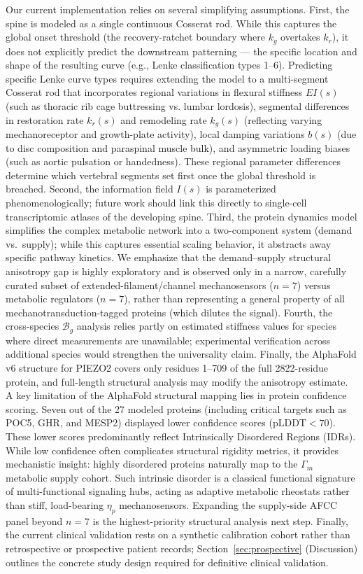 Our current implementation relies on several simplifying assumptions. First, the spine is modeled as a single continuous Cosserat rod. While this captures the global onset threshold (the recovery-ratchet boundary where $k_g$ overtakes $k_r$), it does not explicitly predict the downstream patterning --- the specific location and shape of the resulting curve (e.g., Lenke classification types 1--6). Predicting specific Lenke curve types requires extending the model to a multi-segment Cosserat rod that incorporates regional variations in flexural stiffness $EI(s)$ (such as thoracic rib cage buttressing vs. lumbar lordosis), segmental differences in restoration rate $k_r(s)$ and remodeling rate $k_g(s)$ (reflecting varying mechanoreceptor and growth-plate activity), local damping variations $b(s)$ (due to disc composition and paraspinal muscle bulk), and asymmetric loading biases (such as aortic pulsation or handedness). These regional parameter differences determine which vertebral segments set first once the global threshold is breached. Second, the information field $I(s)$ is parameterized phenomenologically; future work should link this directly to single-cell transcriptomic atlases of the developing spine. Third, the protein dynamics model simplifies the complex metabolic network into a two-component system (demand vs.\ supply); while this captures essential scaling behavior, it abstracts away specific pathway kinetics. We emphasize that the demand--supply structural anisotropy gap is highly exploratory and is observed only in a narrow, carefully curated subset of extended-filament/channel mechanosensors ($n=7$) versus metabolic regulators ($n=7$), rather than representing a general property of all mechanotransduction-tagged proteins (which dilutes the signal). Fourth, the cross-species $\mathcal{B}_g$ analysis relies partly on estimated stiffness values for species where direct measurements are unavailable; experimental verification across additional species would strengthen the universality claim. Finally, the AlphaFold v6 structure for PIEZO2 covers only residues 1--709 of the full 2822-residue protein, and full-length structural analysis may modify the anisotropy estimate.
A key limitation of the AlphaFold structural mapping lies in protein confidence scoring. Seven out of the 27 modeled proteins (including critical targets such as POC5, GHR, and MESP2) displayed lower confidence scores ($\text{pLDDT} < 70$). These lower scores predominantly reflect Intrinsically Disordered Regions (IDRs). While low confidence often complicates structural rigidity metrics, it provides mechanistic insight: highly disordered proteins naturally map to the $\Gamma_m$ metabolic supply cohort. Such intrinsic disorder is a classical functional signature of multi-functional signaling hubs, acting as adaptive metabolic rheostats rather than stiff, load-bearing $\eta_p$ mechanosensors. Expanding the supply-side AFCC panel beyond $n = 7$ is the highest-priority structural analysis next step. Finally, the current clinical validation rests on a synthetic calibration cohort rather than retrospective or prospective patient records; Section~\ref{sec:prospective} (Discussion) outlines the concrete study design required for definitive clinical validation.

